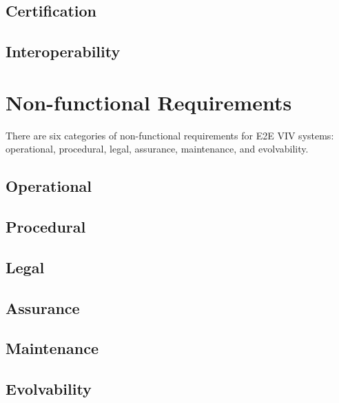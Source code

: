 \subsection{Certification}
\lipsum[10]
\subsection{Interoperability}
\lipsum[11]

\section{Non-functional Requirements}
There are six categories of non-functional requirements for E2E VIV
systems: operational, procedural, legal, assurance, maintenance, and
evolvability.

\subsection{Operational}
\lipsum[13]

\subsection{Procedural}
\lipsum[14]

\subsection{Legal}
\lipsum[15]

\subsection{Assurance}
\lipsum[16]

\subsection{Maintenance}
\lipsum[17]

\subsection{Evolvability}
\lipsum[18]
